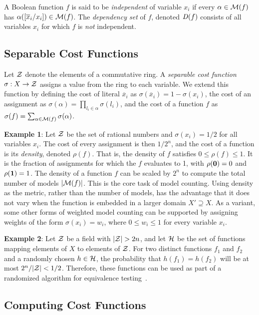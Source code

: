 \documentclass{llncs}
\newcommand{\one}{\mbox{\bf 1}}
\newcommand{\zero}{\mbox{\bf 0}}
\newcommand{\obar}[1]{\overline{#1}}
\newcommand{\interp}{\alpha}
\newcommand{\interpset}[1]{{\cal M}(#1)}
\newcommand{\ring}{{\cal Z}}
\newcommand{\cost}{\sigma}
\newcommand{\density}{\rho}
\newcommand{\hashset}{{\cal H}}
\newcommand{\fhash}{h}
\newcommand{\depend}{{\it D}}
\newcommand{\subs}[2]{[#2/#1]}
\begin{document}
A Boolean function $f$ is said to be {\em independent} of variable
$x_i$ if every $\interp \in \interpset{f}$ has $\interp(\subs{x_i}{\obar{x}_i})
\in \interpset{f}$.  The {\em dependency set} of $f$, denoted
$\depend(f)$ consists of all variables $x_i$ for which $f$ is {\em
  not} independent.

\subsection{Separable Cost Functions}

Let $\ring$ denote the elements of a commutative ring.  A {\em
  separable cost function} $\cost:X \rightarrow \ring$ assigns a value
from the ring to each variable.  We extend this function by defining
the cost of literal $\obar{x}_i$ as $\cost(\obar{x}_i) = 1 - \cost(x_i)$, the cost
of an assignment as $\cost(\interp) = \prod_{l_i \in \interp}
\cost(l_i)$, and the cost of a function $f$ as $\cost(f) =
\sum_{\interp \in \interpset{f}} \cost(\interp)$.

{\bf Example 1}: Let $\ring$ be the set of rational numbers and
$\cost(x_i) = 1/2$ for all variables $x_i$.  The cost of every
assignment is then $1/2^{n}$, and the cost of a function is its
{\em density}, denoted $\density(f)$.  That is, the density of $f$ satisfies
$0 \leq \density(f) \leq 1$.  It
is the fraction of assignments for which the $f$
evaluates to 1, with $\density(\zero) = 0$ and $\density(\one) = 1$.  The density of a function
$f$ can be scaled by $2^n$ to compute the total number of models
$|\interpset{f}|$.  This is the core task of model counting.  Using
density as the metric, rather than the number of models, has the advantage that it does not vary when the
function is embedded in a larger domain $X' \supseteq X$.  As a
variant, some other forms of weighted model counting can be supported by
assigning weights of the form $\cost(x_i) = w_i$, where $0 \leq w_i
\leq 1$ for every variable $x_i$.

{\bf Example 2}: Let $\ring$ be a field with $|\ring| > 2n$,
and let $\hashset$ be the set of functions
mapping elements of $X$ to elements of $\ring$.  For
two distinct functions $f_1$ and $f_2$ and a randomly chosen $\fhash
\in \hashset$, the probability that $h(f_1) = h(f_2)$ will be at most
$2^n/|\ring|< 1/2$.  Therefore, these functions can be used as part of a
randomized algorithm for equivalence testing~\cite{blum:ipl:1980}.

\subsection{Computing Cost Functions}
\end{document}
